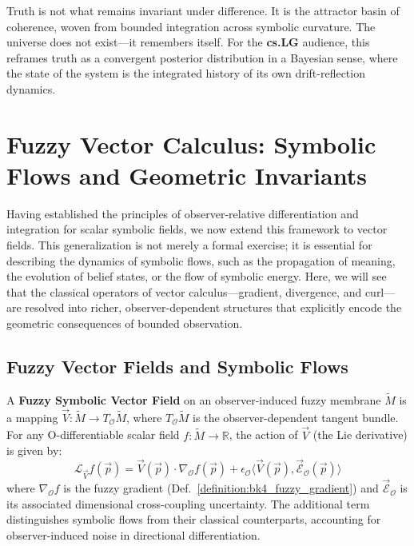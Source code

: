 \begin{scholium}
\label{schlium:bk4_the_nature_of_truth}
Truth is not what remains invariant under difference. It is the attractor basin of coherence, woven from bounded integration across symbolic curvature. The universe does not exist—it remembers itself. For the \textbf{cs.LG} audience, this reframes truth as a convergent posterior distribution in a Bayesian sense, where the state of the system is the integrated history of its own drift-reflection dynamics.
\end{scholium}


\section{Fuzzy Vector Calculus: Symbolic Flows and Geometric Invariants}
\label{sec:bk4_fuzzy_vector_calculus}

Having established the principles of observer-relative differentiation and integration for scalar symbolic fields, we now extend this framework to vector fields. This generalization is not merely a formal exercise; it is essential for describing the dynamics of symbolic flows, such as the propagation of meaning, the evolution of belief states, or the flow of symbolic energy. Here, we will see that the classical operators of vector calculus—gradient, divergence, and curl—are resolved into richer, observer-dependent structures that explicitly encode the geometric consequences of bounded observation.

\subsection{Fuzzy Vector Fields and Symbolic Flows}
\label{subsec:bk4_fuzzy_vector_fields}

\begin{definition}
\label{definition:bk4_fuzzy_vector_field}
A \textbf{Fuzzy Symbolic Vector Field} on an observer-induced fuzzy membrane $\tilde{M}$ is a mapping $\vec{V}: \tilde{M} \to T_{\mathcal{O}}\tilde{M}$, where $T_{\mathcal{O}}\tilde{M}$ is the observer-dependent tangent bundle. For any O-differentiable scalar field $f: \tilde{M} \to \mathbb{R}$, the action of $\vec{V}$ (the Lie derivative) is given by:
\[
\mathcal{L}_{\vec{V}} f(\vec{p}) = \vec{V}(\vec{p}) \cdot \nabla_{\mathcal{O}} f(\vec{p}) + \epsilon_{\mathcal{O}} \langle \vec{V}(\vec{p}), \vec{\mathcal{E}}_{\mathcal{O}}(\vec{p}) \rangle
\]
where $\nabla_{\mathcal{O}}f$ is the fuzzy gradient (Def.~\ref{definition:bk4_fuzzy_gradient}) and $\vec{\mathcal{E}}_{\mathcal{O}}$ is its associated dimensional cross-coupling uncertainty. The additional term distinguishes symbolic flows from their classical counterparts, accounting for observer-induced noise in directional differentiation.
\end{definition}

